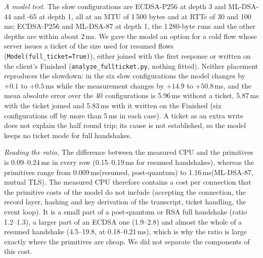 \documentclass[preprint,12pt]{elsarticle}
\newcommand{\ms}{\,ms\xspace}
\newcommand{\Mbits}{\,Mbit/s\xspace}
\begin{document}
\emph{A model test.} The slow configurations are ECDSA-P256 at depth 3 and ML-DSA-44 and -65 at depth 1, all at an MTU of 1\,500 bytes and at RTTs of 30 and 100\ms; ECDSA-P256 and ML-DSA-87 at depth 1, the 1\,280-byte runs and the other depths are within about 2\ms. We gave the model an option for a cold flow whose server issues a ticket of the size used for resumed flows (\texttt{Model(full\_ticket=True)}), either joined with the first response or written on the client's Finished (\texttt{analyze\_fullticket.py}, nothing fitted). Neither placement reproduces the slowdown: in the six slow configurations the model changes by $+0.1$ to $+0.5$\ms while the measurement changes by $+14.9$ to $+50.8$\ms, and the mean absolute error over the 40 configurations is 5.96\ms without a ticket, 5.87\ms with the ticket joined and 5.83\ms with it written on the Finished (six configurations off by more than 5\ms in each case). A ticket as an extra write does not explain the half round trip; its cause is not established, so the model keeps no ticket mode for full handshakes.

\begin{table}[!htbp]\centering\small
\caption{A full transaction that also issues a session ticket against the ticketless one of the main campaign (excess latency over the unshaped run, ms; same suite, chain depth, RTT, MTU, initial window of 10, 100\Mbits, 302/222-byte transaction, Reno with quick acknowledgements). The model has no mode for a full handshake with a ticket. In 6 of the 40 configurations that have a ticketless reference, the transaction with a ticket was slower by half a round trip (median 0.51 RTT); the median difference over all is 0.6\ms.}
\label{tab:ticket}
\resizebox{\textwidth}{!}{}
\end{table}

\begin{table}[!htbp]\centering\small
\caption{CPU per transaction of an event-driven OpenSSL~3.5.4 server on one Cortex-X925 core (loopback, saturated by a multi-threaded load generator; user and system CPU of the server process over the measurement window divided by the transactions it completed; ms) against the sum of the primitive costs of the model for the same operations. Chain depth 2, or 1 for resumed.}
\label{tab:srvcpu}
\resizebox{\textwidth}{!}{}
\end{table}

\emph{Reading the ratio.} The difference between the measured CPU and the primitives is 0.09--0.24\ms in every row (0.15--0.19\ms for resumed handshakes), whereas the primitives range from 0.009\ms (resumed, post-quantum) to 1.16\ms (ML-DSA-87, mutual TLS). The measured CPU therefore contains a cost per connection that the primitive costs of the model do not include (accepting the connection, the record layer, hashing and key derivation of the transcript, ticket handling, the event loop). It is a small part of a post-quantum or RSA full handshake (ratio 1.2--1.3), a larger part of an ECDSA one (1.9--2.8) and almost the whole of a resumed handshake (4.5--19.8, at 0.18--0.21\ms), which is why the ratio is large exactly where the primitives are cheap. We did not separate the components of this cost.
\end{document}

